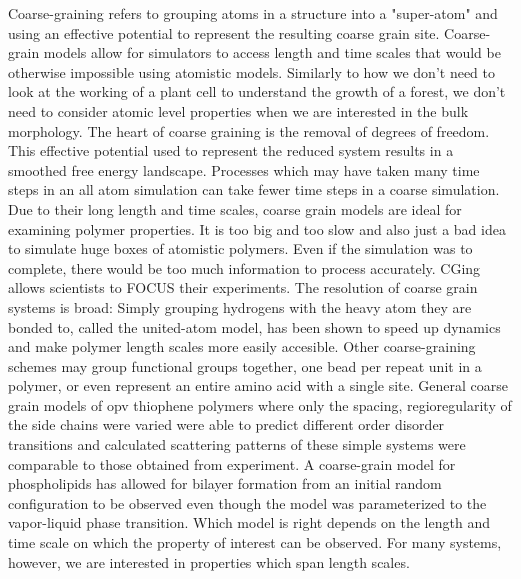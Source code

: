 Coarse-graining refers to grouping atoms in a structure into a "super-atom" and using an effective potential to represent the resulting coarse grain site.
Coarse-grain models allow for simulators to access length and time scales that would be otherwise impossible using atomistic models.
Similarly to how we don't need to look at the working of a plant cell to understand the growth of a forest, we don't need to consider atomic level properties when we are interested in the bulk morphology\cite{Muller-Plathe2002}.
The heart of coarse graining is the removal of degrees of freedom. 
This effective potential used to represent the reduced system results in a smoothed free energy landscape. 
Processes which may have taken many time steps in an all atom simulation can take fewer time steps in a coarse simulation\cite{Berendsen2010}.
Due to their long length and time scales, coarse grain models are ideal for examining polymer properties\cite{Gartner2019a}.
It is too big and too slow and also just a bad idea to simulate huge boxes of atomistic polymers.
Even if the simulation was to complete, there would be too much information to process accurately. 
CGing allows scientists to FOCUS their experiments\cite{Baschnagel2000}.
The resolution of coarse grain systems is broad:
Simply grouping hydrogens with the heavy atom they are bonded to, called the united-atom model, has been shown to speed up dynamics and make polymer length scales more easily accesible\cite{Paul1995a, Yang2006a}.
Other coarse-graining schemes may group functional groups together\cite{Berendsen2010, Jankowski2013, Marsh2014}, one bead per repeat unit in a polymer\cite{Lee2011}, or even represent an entire amino acid with a single site\cite{Peng2019}.
General coarse grain models of opv thiophene polymers where only the spacing, regioregularity of the side chains were varied were able to predict different order disorder transitions and calculated scattering patterns of these simple systems were comparable to those obtained from experiment\cite{Jankowski2013, Marsh2014}.
A coarse-grain model for phospholipids has allowed for bilayer formation from an initial random configuration to be observed even though the model was parameterized to the vapor-liquid phase transition\cite{Shelley2001}.
Which model is right depends on the length and time scale on which the property of interest can be observed.
For many systems, however, we are interested in properties which span length scales.
